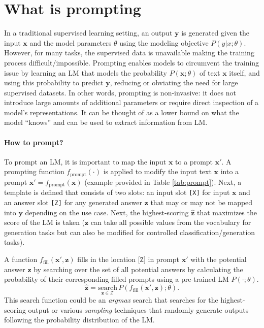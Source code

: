 \section{What is prompting}
In a traditional supervised learning setting, an output $\bm{y}$ is generated given the input $\bm{x}$ and the model parameters $\theta$ using the modeling objective $P(y|x;\theta)$. However, for many tasks, the supervised data is unavailable making the training process difficult/impossible. 
Prompting enables models to circumvent the training issue by learning an LM that models the probability $P(\bm{x};\theta)$ of text $\bm{x}$ itself, and using this probability to predict $\bm{y}$, reducing or obviating the need for large supervised datasets. In other words, prompting is non-invasive: it does not introduce large amounts of additional parameters or require direct inspection of a model’s representations. It can be thought of as a lower bound on what the model “knows” and can be used to extract information from LM. 

\paragraph{How to prompt?}
To prompt an LM, it is important to map the input $\bm{x}$ to a prompt $\bm{x}'$. A prompting function $f_{\text{prompt}}(\cdot)$ is applied to modify the input text $\bm{x}$ into a prompt $\bm{x}' = f_{\text{prompt}}(\bm{x})$ (example provided in Table \ref{tab:prompt}). Next, a template is defined that consists of two slots: an input slot \texttt{[X]} for input $\bm{x}$ and an answer slot \texttt{[Z]} for any generated answer $\bm{z}$ that may or may not be mapped into $\bm{y}$ depending on the use case. Next, the highest-scoring $\hat{\bm{z}}$ that maximizes the score of the LM is taken ($\bm{z}$ can take all possible values from the vocabulary for generation tasks but can also be modified for controlled classification/generation tasks). 

A function $f_{\text{fill}}(\bm{x'}, \bm{z})$ fills in the location $\texttt{[Z]}$ in prompt $\bm{x}'$ with the potential answer $\bm{z}$ by searching over the set of all potential answers by calculating the probability of their corresponding filled prompts using a pre-trained LM $P(\cdot;\theta)$. 
\begin{equation}
    \hat{\bm{z}} = \underset{\bm{z} \in \mathcal{Z}}{\text{search}} \, P(f_{\text{fill}}(\bm{x'}, \bm{z}); \theta).
\end{equation}
This search function could be an \textit{argmax} search that searches for the highest-scoring output or various \textit{sampling} techniques that randomly generate outputs following the probability distribution of the LM. 

